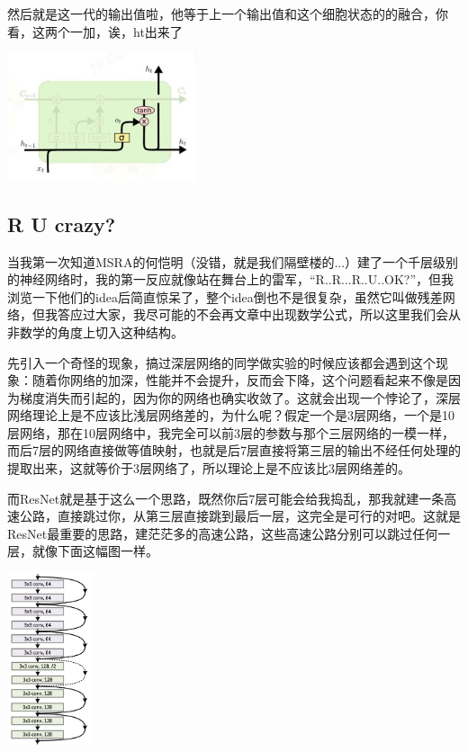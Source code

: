 \documentclass{article}
\begin{document}
然后就是这一代的输出值啦，他等于上一个输出值和这个细胞状态的的融合，你看，这两个一加，诶，ht出来了
\begin{center}
\includegraphics[width=2.2in]{image/image034.jpg}
\end{center}


\subsection{R U crazy?}
当我第一次知道MSRA的何恺明（没错，就是我们隔壁楼的...）建了一个千层级别的神经网络时，我的第一反应就像站在舞台上的雷军，“R..R...R..U..OK?”，但我浏览一下他们的idea后简直惊呆了，整个idea倒也不是很复杂，虽然它叫做残差网络，但我答应过大家，我尽可能的不会再文章中出现数学公式，所以这里我们会从非数学的角度上切入这种结构。

先引入一个奇怪的现象，搞过深层网络的同学做实验的时候应该都会遇到这个现象：随着你网络的加深，性能并不会提升，反而会下降，这个问题看起来不像是因为梯度消失而引起的，因为你的网络也确实收敛了。这就会出现一个悖论了，深层网络理论上是不应该比浅层网络差的，为什么呢？假定一个是3层网络，一个是10层网络，那在10层网络中，我完全可以前3层的参数与那个三层网络的一模一样，而后7层的网络直接做等值映射，也就是后7层直接将第三层的输出不经任何处理的提取出来，这就等价于3层网络了，所以理论上是不应该比3层网络差的。

而ResNet就是基于这么一个思路，既然你后7层可能会给我捣乱，那我就建一条高速公路，直接跳过你，从第三层直接跳到最后一层，这完全是可行的对吧。这就是ResNet最重要的思路，建茫茫多的高速公路，这些高速公路分别可以跳过任何一层，就像下面这幅图一样。

\begin{center}
\includegraphics[width=1in]{image/resnet.jpg}
\end{center}
\end{document}

